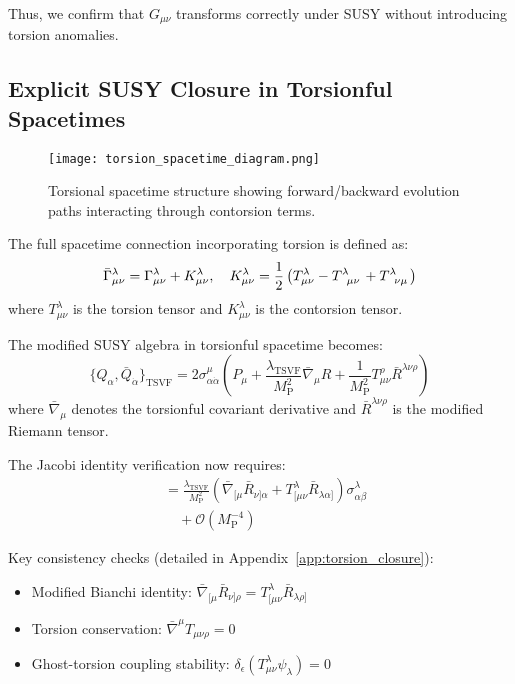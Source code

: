 \documentclass[12pt, onecolumn]{article}
\theoremstyle{definition}
\newcommand{\tsvf}{\lambda_{\mathrm{TSVF}}}
\newcommand{\Mp}{M_{\mathrm{P}}}
\numberwithin{equation}{section}
\begin{document}
Thus, we confirm that $G_{\mu\nu}$ transforms correctly under SUSY without introducing torsion anomalies.


\subsection{Explicit SUSY Closure in Torsionful Spacetimes}
\label{subsec:torsion_closure}

\begin{figure}[htbp]
\centering
\texttt{[image: torsion\_spacetime\_diagram.png]}
\caption{Torsional spacetime structure showing forward/backward evolution paths interacting through contorsion terms.}
\label{fig:torsion_structure}
\end{figure}

The full spacetime connection incorporating torsion is defined as:
\begin{equation}
\bar{\Gamma}^\lambda_{\mu\nu} = \Gamma^\lambda_{\mu\nu} + K^\lambda_{\mu\nu}, \quad 
K^\lambda_{\mu\nu} = \frac{1}{2}\left(T^\lambda_{\mu\nu} - T\indices{^\lambda_{\mu\nu}} + T\indices{^\lambda_{\nu\mu}}\right)
\end{equation}
where \(T^\lambda_{\mu\nu}\) is the torsion tensor and \(K^\lambda_{\mu\nu}\) is the contorsion tensor.

The modified SUSY algebra in torsionful spacetime becomes:
\begin{equation}
\{Q_\alpha, \bar{Q}_{\dot{\alpha}}\}_{\text{TSVF}} = 2\sigma^\mu_{\alpha\dot{\alpha}}\left(P_\mu + \frac{\tsvf}{\Mp^2}\bar{\nabla}_\mu R + \frac{1}{\Mp^2}T^\rho_{\mu\nu}\bar{R}^{\lambda\nu\rho}\right)
\label{eq:torsion_susy_algebra}
\end{equation}
where \(\bar{\nabla}_\mu\) denotes the torsionful covariant derivative and \(\bar{R}^{\lambda\nu\rho}\) is the modified Riemann tensor.

The Jacobi identity verification now requires:
\begin{align}
[Q_\alpha, \{Q_\beta, A_\mu\}] &= \frac{\tsvf}{\Mp^2}\left(\bar{\nabla}_{[\mu}\bar{R}_{\nu]\alpha} + T^\lambda_{[\mu\nu}\bar{R}_{\lambda\alpha]}\right)\sigma^\lambda_{\alpha\beta} \nonumber \\
&\quad + \mathcal{O}(\Mp^{-4})
\label{eq:torsion_jacobi}
\end{align}

Key consistency checks (detailed in Appendix~\ref{app:torsion_closure}):
\begin{itemize}
\item Modified Bianchi identity: \(\bar{\nabla}_{[\mu}\bar{R}_{\nu]\rho} = T^\lambda_{[\mu\nu}\bar{R}_{\lambda\rho]}\)
\item Torsion conservation: \(\bar{\nabla}^\mu T_{\mu\nu\rho} = 0\)
\item Ghost-torsion coupling stability: \(\delta_\epsilon(T^\lambda_{\mu\nu}\psi_\lambda) = 0\)
\end{itemize}
\end{document}
